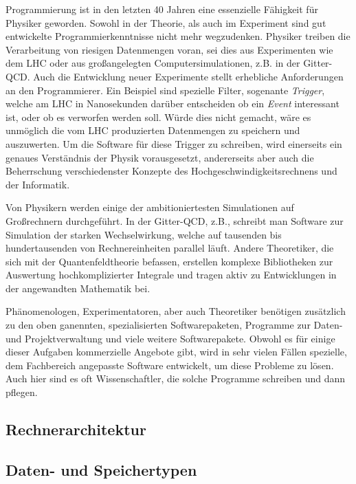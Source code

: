Programmierung ist in den letzten 40 Jahren eine essenzielle Fähigkeit für Physiker geworden.
Sowohl in der Theorie, als auch im Experiment sind gut entwickelte Programmierkenntnisse nicht mehr wegzudenken.
Physiker treiben die Verarbeitung von riesigen Datenmengen voran, sei dies aus Experimenten wie dem LHC oder aus großangelegten Computersimulationen, z.B. in der Gitter-QCD.
Auch die Entwicklung neuer Experimente stellt erhebliche Anforderungen an den Programmierer.
Ein Beispiel sind spezielle Filter, sogenante \emph{Trigger}, welche am LHC in Nanosekunden darüber entscheiden ob ein \emph{Event} interessant ist, oder ob es verworfen werden soll.
Würde dies nicht gemacht, wäre es unmöglich die vom LHC produzierten Datenmengen zu speichern und auszuwerten.
Um die Software für diese Trigger zu schreiben, wird einerseits ein genaues Verständnis der Physik vorausgesetzt, andererseits aber auch die Beherrschung verschiedenster Konzepte des Hochgeschwindigkeitsrechnens und der Informatik.

Von Physikern werden einige der ambitioniertesten Simulationen auf Großrechnern durchgeführt.
In der Gitter-QCD, z.B., schreibt man Software zur Simulation der starken Wechselwirkung, welche auf tausenden bis hundertausenden von Rechnereinheiten parallel läuft.
Andere Theoretiker, die sich mit der Quantenfeldtheorie befassen, erstellen komplexe Bibliotheken zur Auswertung hochkomplizierter Integrale und tragen aktiv zu Entwicklungen in der angewandten Mathematik bei.

Phänomenologen, Experimentatoren, aber auch Theoretiker benötigen zusätzlich zu den oben ganennten, spezialisierten Softwarepaketen, Programme zur Daten- und Projektverwaltung und viele weitere Softwarepakete.
Obwohl es für einige dieser Aufgaben kommerzielle Angebote gibt, wird in sehr vielen Fällen spezielle, dem Fachbereich angepasste Software entwickelt, um diese Probleme zu lösen.
Auch hier sind es oft Wissenschaftler, die solche Programme schreiben und dann pflegen.

\subsection{Rechnerarchitektur}

\iflecturer
\begin{framed}
  
  \blackboard{}
\end{framed}
\fi

\subsection{Daten- und Speichertypen}

